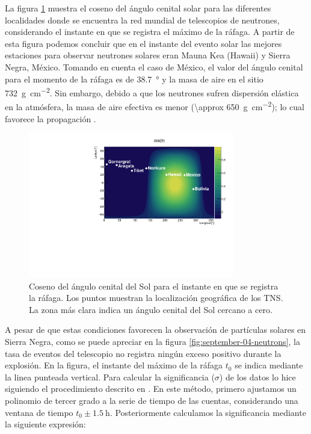 La figura \ref{fig:september-04-zenith} muestra el coseno del ángulo cenital solar para las diferentes localidades donde se encuentra la red mundial de telescopios de neutrones, considerando el instante en que se registra el máximo de la ráfaga. A partir de esta figura podemos concluir que en el instante del evento solar las mejores estaciones para observar neutrones solares eran Mauna Kea (Hawaii) y Sierra Negra, México. Tomando en cuenta el caso de México, el valor del ángulo cenital para el momento de la ráfaga es de \SI{38.7}{\degree} y la masa de aire en el sitio \SI{732}{\gram\per\square\cm}. Sin embargo, debido a que los neutrones sufren dispersión elástica en la atmósfera, la masa de aire efectiva es menor (\SI{\approx 650}{\gram\per\square\cm}); lo cual favorece la propagación \cite{dorman99,shibata94}.

\begin{figure}
        \centering
        \includegraphics[width=0.8\textwidth]{cosz_170904.pdf}
        \caption{Coseno del ángulo cenital del Sol para el instante en que se registra la ráfaga. Los puntos muestran la localización geográfica de los TNS. La zona más clara indica un ángulo cenital del Sol cercano a cero.}
        \label{fig:september-04-zenith}
\end{figure}

A pesar de que estas condiciones favorecen la observación de partículas solares en Sierra Negra, como se puede apreciar en la figura \ref{fig:september-04-neutrons}, la tasa de eventos del telescopio no registra ningún exceso positivo durante la explosión. En la figura, el instante del máximo de la ráfaga $t_{0}$ se indica mediante la linea punteada vertical. Para calcular la significancia ($\sigma$) de los datos lo hice siguiendo el procedimiento descrito en \cite{diegophd}. En este método, primero ajustamos un polinomio de tercer grado a la serie de tiempo de las cuentas, considerando una ventana de tiempo $t_{0}\pm\SI{1.5}{\hour}$. Posteriormente calculamos la significancia mediante la siguiente expresión:

